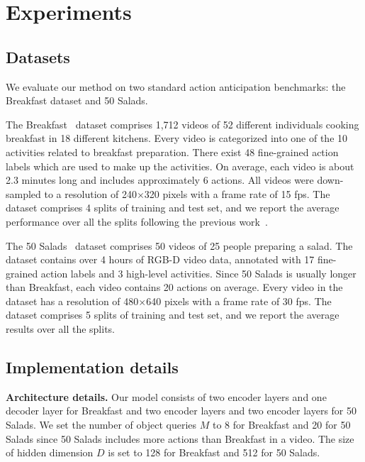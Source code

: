 
\section{Experiments}
\subsection{Datasets}
\label{sec:5.1}
We evaluate our method on two standard action anticipation benchmarks: the Breakfast dataset and 50 Salads.

The Breakfast~\cite{kuehne2014language} dataset comprises 1,712 videos of 52 different individuals cooking breakfast in 18 different kitchens.
Every video is categorized into one of the 10 activities related to breakfast preparation.
There exist 48 fine-grained action labels which are used to make up the activities.
On average, each video is about 2.3 minutes long and includes approximately 6 actions.
All videos were down-sampled to a resolution of 240$\times$320 pixels with a frame rate of 15 fps.
The dataset comprises 4 splits of training and test set, and we report the average performance over all the splits following the previous work~\cite{abu2018will,sener2020temporal,farha2020long}.

The 50 Salads~\cite{stein2013combining} dataset comprises 50 videos of 25 people preparing a salad. The dataset contains over 4 hours of RGB-D video data, annotated with 17 fine-grained action labels and 3 high-level activities. Since 50 Salads is usually longer than Breakfast, each video contains 20 actions on average. Every video in the dataset has a resolution of 480$\times$640 pixels with a frame rate of 30 fps. The dataset comprises 5 splits of training and test set, and we report the average results over all the splits.

\subsection{Implementation details}
\label{sec:5.2}
\noindent
\textbf{Architecture details.}
Our model consists of two encoder layers and one decoder layer for Breakfast and two encoder layers and two encoder layers for 50 Salads. 
We set the number of object queries $M$ to 8 for Breakfast and 20 for 50 Salads since 50 Salads includes more actions than Breakfast in a video.
The size of hidden dimension $D$ is set to 128 for Breakfast and 512 for 50 Salads.

